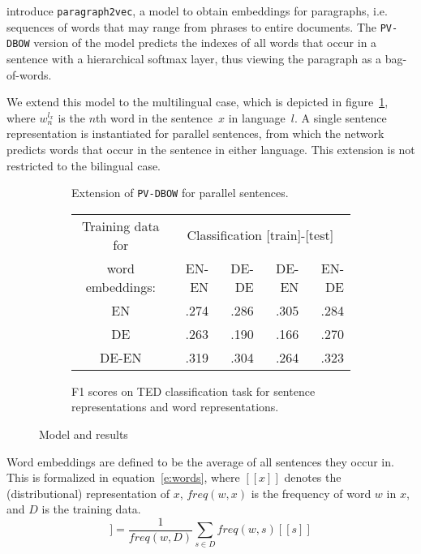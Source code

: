 \documentclass[a4paper,11pt]{article}
\begin{document}

\cite{le2014distributed} introduce {\tt paragraph2vec}, a model to obtain embeddings for paragraphs, i.e. sequences of words that may range from phrases  to entire documents. The {\tt PV-DBOW} version of the model predicts the indexes of all words that occur in a sentence with a hierarchical softmax layer, thus viewing the paragraph as a bag-of-words. 

We extend this model to the multilingual case, which is depicted in figure~\ref{f:model}, where $w_n^{l_x}$ is the $n$th word in the sentence~$x$ in language~$l$. A single sentence representation is instantiated for parallel sentences, from which the network predicts words that occur in the sentence in either language. This extension is not restricted to the bilingual case.%

\begin{figure}\center
\begin{subfigure}{.35\linewidth}
\center

\caption{Extension of {\tt PV-DBOW} for parallel sentences.}
\label{f:model}
\end{subfigure}
\begin{subfigure}{.64\linewidth}
\flushright
\begin{tabular}{c | r r r r }
Training data	for	&	\multicolumn{4}{c}{Classification [train]-[test]}	\\
word 	embeddings:	&EN-EN	&DE-DE	&DE-EN	&EN-DE		\\\hline
EN			&.274		&.286		&.305		&.284		\\
DE			&.263		&.190		&.166		&.270		\\
DE-EN			&.319		&.304		&.264		&.323		\\
\end{tabular}
\caption{F1 scores on TED classification task for sentence representations and word representations.}
\label{t:dbow_mono_bi}
\end{subfigure}
\caption{Model and results}
\end{figure}


Word embeddings are defined to be the average of all sentences they occur in. This is  formalized in equation~\ref{e:words}, where $[\![ x ]\!]$ denotes the (distributional) representation of $x$, $freq(w,x)$ is the frequency of word $w$ in $x$, and $D$ is the training data.
\begin{equation}
[\![ w ]\!] =\frac{1}{freq(w,D)}\sum_{s\in D}freq(w,s) [\![ s ]\!]
\label{e:words}
\end{equation}
\end{document}
